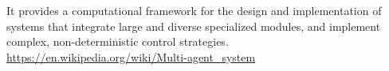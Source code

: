 \documentclass[a4paper]{article}
\title{}
\date{}
\begin{document}
    \maketitle
    It provides a computational framework for the design and implementation of systems that integrate large and diverse specialized modules, and implement complex, non-deterministic control strategies.
    \url{https://en.wikipedia.org/wiki/Multi-agent_system}
\end{document}
